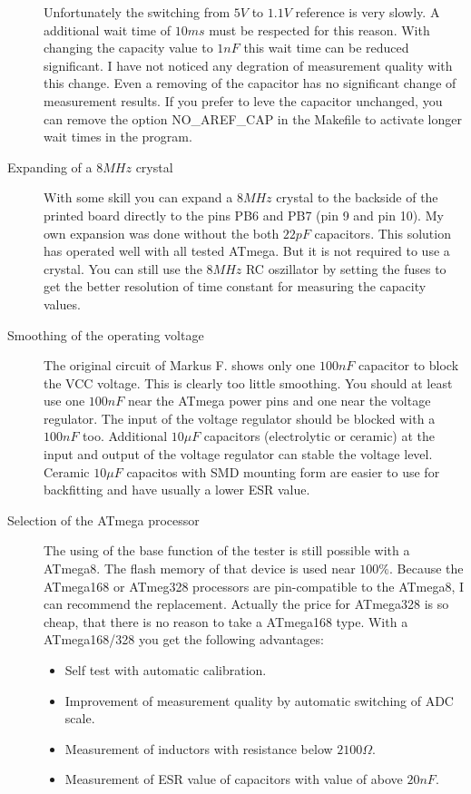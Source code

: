 \begin{description}
Unfortunately the switching from \(5V\) to \(1.1V\) reference is very slowly. A additional
wait time of \(10ms\) must be respected for this reason.
With changing the capacity value to \(1nF\) this wait time can be reduced significant.
I have not noticed any degration of measurement quality with this change.
Even a removing of the capacitor has no significant change of measurement results.
If you prefer to leve the capacitor unchanged, you can remove the option NO\_AREF\_CAP
in the Makefile to activate longer wait times in the program.
\item[Expanding of a \(8MHz\) crystal]
With some skill you can expand a \(8MHz\) crystal to the backside of the printed board
directly to the pins PB6 and PB7 (pin 9 and pin 10).
My own expansion was done without the both \(22pF\) capacitors.
This solution has operated well with all tested ATmega.
But it is not required to use a crystal. You can still use the \(8MHz\) RC oszillator
by setting the fuses to get the better resolution of time constant for measuring  the capacity values.
\item[Smoothing of the operating voltage]
The original circuit of Markus F. shows only one \(100nF\) capacitor to block the VCC voltage.
This is clearly too little smoothing. You should at least use one \(100nF\) near the ATmega power pins
and one near the voltage regulator. The input of the voltage regulator should be
blocked with a \(100nF\) too.
Additional \(10\mu F\) capacitors (electrolytic or ceramic) at the input and
output of the voltage regulator can stable the voltage level.
Ceramic \(10\mu F\) capacitos with SMD mounting form are easier to use for backfitting
and have usually a lower ESR value. 
\item[Selection of the ATmega processor]
The using of the base function of the tester is still possible with a ATmega8.
The flash memory of that device is used near \(100\%\).
Because the ATmega168 or ATmeg328 processors are pin-compatible to the ATmega8,
I can recommend the replacement.
Actually the price for ATmega328 is so cheap, that there is no reason to take
a ATmega168 type.
With a ATmega168/328 you get the following advantages:
 \begin{itemize}
 \item Self test with automatic calibration.
 \item Improvement of measurement quality by automatic switching of ADC scale.
 \item Measurement of inductors with resistance  below \(2100\Omega\).
 \item Measurement of ESR value of capacitors with value of above  \(20nF\).

\end{itemize}
\end{description}
